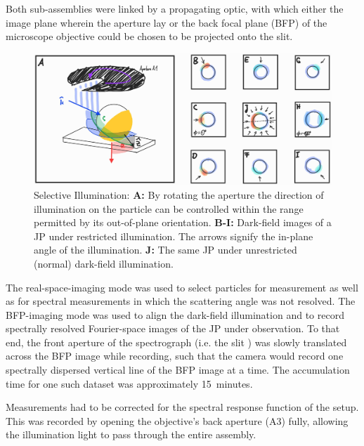 \documentclass[10pt]{article}
\begin{document}
\begin{multicols}{2}
Both sub-assemblies were linked by a propagating optic, with which either the image plane wherein the aperture lay or the back focal plane (BFP) of the microscope objective could be chosen to be projected onto the slit. 

\begin{figure}[t!]
    \centering
    \includegraphics[width=\textwidth]{[fig] selective illumination}
    \caption{Selective Illumination:   
    {\sffamily\bfseries A:} By rotating the aperture {} the direction of illumination on the particle can be controlled within the range permitted by its out-of-plane orientation. 
    {\sffamily\bfseries B-I:} Dark-field images of a JP under restricted illumination. 
    The arrows signify the in-plane angle of the illumination.  
    {\sffamily\bfseries J:} The same JP under unrestricted (normal) dark-field illumination. 
    }
    \label{fig:selective-illumination}
\end{figure}

The real-space-imaging mode was used to select particles for measurement as well as for spectral measurements in which the scattering angle was not resolved. 
The BFP-imaging mode was used to align the dark-field illumination and to record spectrally resolved Fourier-space images of the JP under observation. 
To that end, the front aperture of the spectrograph (i.e. the slit {}) was slowly translated across the BFP image while recording, such that the camera would record one spectrally dispersed vertical line of the BFP image at a time. 
The accumulation time for one such dataset was approximately \mbox{15 minutes}.  

Measurements had to be corrected for the spectral response function of the setup. 
This was recorded by opening the objective's back aperture {\sffamily(A3)} fully, allowing the illumination light to pass through the entire assembly. 


\end{multicols}
\end{document}
